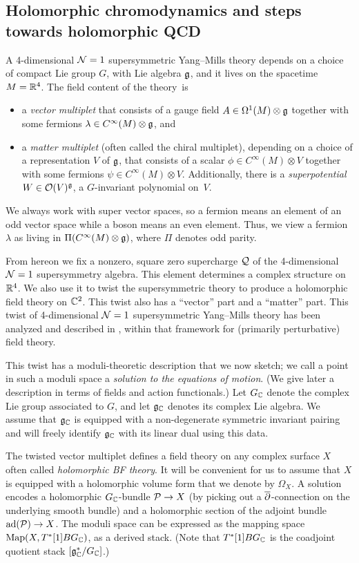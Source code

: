 \documentclass[11pt]{amsart}
\begin{document}
\subsection{Holomorphic chromodynamics and steps towards holomorphic QCD}

A 4-dimensional $\mathcal N=1$ supersymmetric Yang--Mills theory depends on a choice of compact Lie group $G$, with Lie algebra $\mathfrak g$, 
and it lives on  the spacetime $M=\mathbb R^4$.
The field content of the theory~is
\begin{itemize}
\item a {\it vector multiplet} that consists of a gauge field $A \in \Omega^1(M) \otimes \mathfrak g $ together with some fermions $\lambda \in C^\infty(M) \otimes \mathfrak g$, and
\item a {\it matter multiplet} (often called the chiral multiplet), depending on a choice of a representation $V$ of $\mathfrak g$, that consists of a scalar $\phi \in C^\infty(M) \otimes V$ together with some fermions $\psi \in C^\infty(M) \otimes V$. 
Additionally, there is a {\it superpotential} $W \in \mathcal O(V)^\mathfrak g$, a $G$-invariant polynomial on~$V$. 
\end{itemize}
We always work with super vector spaces, so a fermion means an element of an odd vector space while a boson means an even element.
Thus, we view a fermion $\lambda$ as living in $\Pi (C^\infty(M) \otimes \mathfrak g)$,
where $\Pi$ denotes odd parity.

From hereon we fix a nonzero, square zero supercharge $\mathcal Q$ of the 4-dimensional $\mathcal N=1$ supersymmetry algebra.
This element determines a complex structure on $\mathbb R^4$.
We also use it to twist the supersymmetric theory to produce a holomorphic field theory on $\mathbb C^2$.
This twist also has a ``vector'' part and a ``matter'' part.
This twist of 4-dimensional $\mathcal N=1$ supersymmetric Yang--Mills theory has been analyzed and described in \cite{CosYangian, ESW, SWchar}, within that framework for (primarily perturbative) field theory.

This twist has a moduli-theoretic description that we now sketch;
we call a point in such a moduli space a {\it solution to the equations of motion}. 
(We give later a description in terms of fields and action functionals.)
Let $G_\mathbb C$ denote the complex Lie group associated to $G$,
and let $\mathfrak g_\mathbb C$ denotes its complex Lie algebra.
We assume that $\mathfrak g_\mathbb C$ is equipped with a non-degenerate symmetric invariant pairing and will freely identify $\mathfrak g_\mathbb C$ with its linear dual using this data.

The twisted vector multiplet defines a field theory on any complex surface $X$ often called {\em holomorphic BF theory}. 
It will be convenient for us to assume that $X$ is equipped with a holomorphic volume form that we denote by $\Omega_X$. 
A solution encodes a holomorphic $G_\mathbb C$-bundle $\mathcal P \to X$ (by picking out a ${\overline{\partial}}$-connection on the underlying smooth bundle) and a holomorphic section of the adjoint bundle $\mathrm{ad}(\mathcal P) \to X$.
The moduli space can be expressed as the mapping space ${\rm Map}(X, T^*[1]BG_{\mathbb C})$, as a derived stack.
(Note that $T^*[1]BG_{\mathbb C}$ is the coadjoint quotient stack $[\mathfrak g_\mathbb C^*/G_{\mathbb C}]$.)
\end{document}
